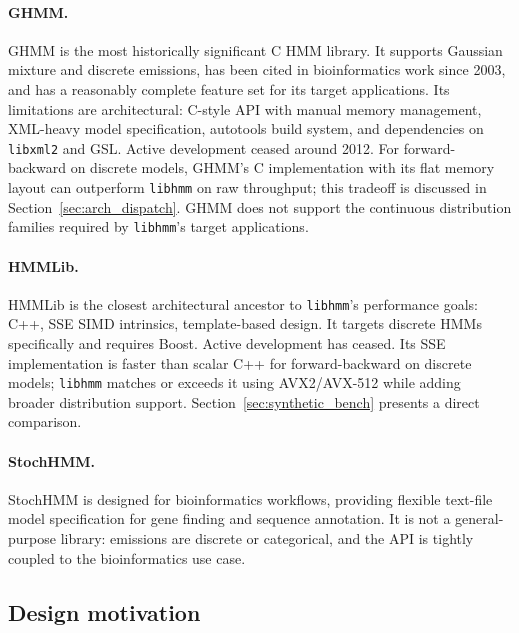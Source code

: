 \documentclass[11pt]{article}
\begin{document}
\paragraph{GHMM.}
GHMM \citep{Schliep2003} is the most historically significant C HMM library.
It supports Gaussian mixture and discrete emissions, has been cited in
bioinformatics work since 2003, and has a reasonably complete feature set
for its target applications.
Its limitations are architectural: C-style API with manual memory management,
XML-heavy model specification, autotools build system, and dependencies on
\texttt{libxml2} and GSL.
Active development ceased around 2012.
For forward-backward on discrete models, GHMM's C implementation with its
flat memory layout can outperform \texttt{libhmm} on raw throughput;
this tradeoff is discussed in Section~\ref{sec:arch_dispatch}.
GHMM does not support the continuous distribution families required by
\texttt{libhmm}'s target applications.

\paragraph{HMMLib.}
HMMLib is the closest architectural ancestor to \texttt{libhmm}'s
performance goals: C++, SSE SIMD intrinsics, template-based design.
It targets discrete HMMs specifically and requires Boost.
Active development has ceased.
Its SSE implementation is faster than scalar C++ for forward-backward on
discrete models; \texttt{libhmm} matches or exceeds it using AVX2/AVX-512
while adding broader distribution support.
Section~\ref{sec:synthetic_bench} presents a direct comparison.

\paragraph{StochHMM.}
StochHMM is designed for bioinformatics workflows, providing flexible
text-file model specification for gene finding and sequence annotation.
It is not a general-purpose library: emissions are discrete or categorical,
and the API is tightly coupled to the bioinformatics use case.

\subsection{Design motivation}
\end{document}
